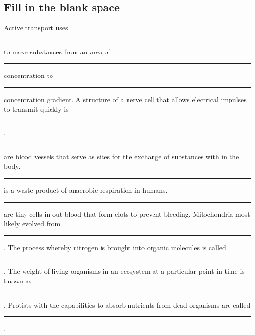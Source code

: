 \documentclass[12pt,addpoints]{exam}
\begin{document}
\begin{questions}
\begin{center}
		\subsection*{Fill in the blank space}
	\end{center}
		\question Active transport uses \noindent\rule{1.5in}{0.4pt} to move substances from an area of \noindent\rule{1.5in}{0.4pt} concentration to \noindent\rule{1.5in}{0.4pt} concentration gradient.
		\question A structure of a nerve cell that allows electrical impulses to transmit quickly is \noindent\rule{1.5in}{0.4pt}.
		\question \noindent\rule{1in}{0.4pt} are blood vessels that serve as sites for the exchange of substances with in the body.
		\question \noindent\rule{1.5in}{0.4pt} is a waste product of anaerobic respiration in humans.
		\question \noindent\rule{1.5in}{0.4pt} are tiny cells in out blood that form clots to prevent bleeding.
		\question Mitochondria most likely evolved from \noindent\rule{1in}{0.4pt}.
		\question The process whereby nitrogen is brought into organic molecules is called \noindent\rule{1in}{0.4pt}.
		\question The weight of living organisms in an ecosystem at a particular point in time is known as \noindent\rule{1in}{0.4pt}.
		\question Protists with the capabilities to absorb nutrients from dead organisms are called \noindent\rule{1in}{0.4pt}.
		
	\begin{center}

\end{center}
\end{questions}
\end{document}
